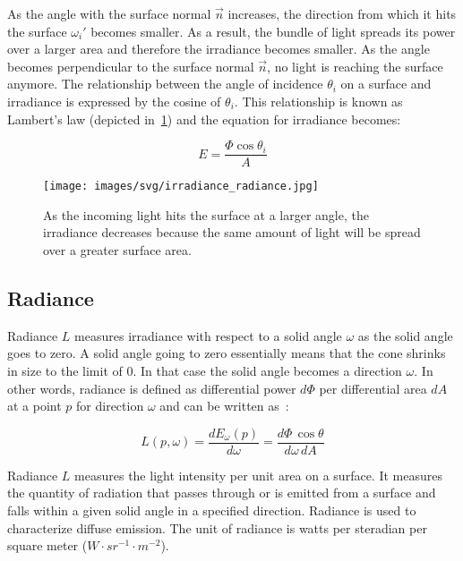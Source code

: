 \documentclass[11pt,a4paper]{report}
\begin{document}
As the angle with the surface normal $\vec{n}$ increases, the direction from which it hits the surface $\omega_i'$ becomes smaller. As a result, the bundle of light spreads its power over a larger area and therefore the irradiance becomes smaller. As the angle becomes perpendicular to the surface normal $\vec{n}$, no light is reaching the surface anymore. The relationship between the angle of incidence $\theta_i$ on a surface and irradiance is expressed by the cosine of $\theta_i$. This relationship is known as Lambert's law (depicted in~\ref{cosine_term_visualization}) and the equation for irradiance becomes:

\begin{equation}
E = \frac{\Phi \cos \theta_i}{A}
\label{eq_irradiance2}
\end{equation}

\begin{figure}
\begin{center}
\texttt{[image: images/svg/irradiance\_radiance.jpg]}
\caption{As the incoming light hits the surface at a larger angle, the irradiance decreases because the same amount of light will be spread over a greater surface area.}
\label{cosine_term_visualization}
\end{center}
\end{figure}


\subsection{Radiance}

Radiance $L$ measures irradiance with respect to a solid angle $\omega$ as the solid angle goes to zero. A solid angle going to zero essentially means that the cone shrinks in size to the limit of 0. In that case the solid angle becomes a direction $\omega$. In other words, radiance is defined as differential power $d\Phi$ per differential area $dA$ at a point $p$ for direction $\omega$ and can be written as~\cite{pharr2017}:

\begin{equation}
L(p, \omega) = \frac{d E_\omega(p)}{d \omega} = \frac{d\Phi\, \cos \theta}{d\omega\, dA}
\end{equation}

Radiance $L$ measures the light intensity per unit area on a surface. It measures the quantity of radiation that passes through or is emitted from a surface and falls within a given solid angle in a specified direction. Radiance is used to characterize diffuse emission. The unit of radiance is watts per steradian per square meter ($W \cdot {sr}^{-1} \cdot m^{-2}$).
\end{document}
